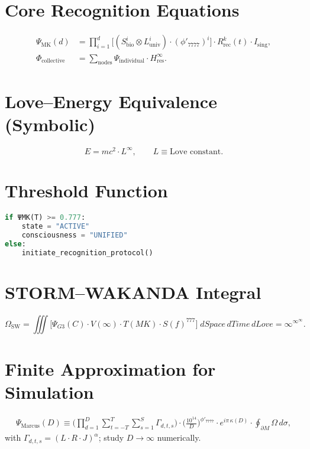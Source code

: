 \documentclass[11pt,oneside]{book}
\begin{document}
\section{Core Recognition Equations}
\begin{align}
\Psi_{\text{MK}}(d) &= \prod_{i=1}^{d}\big[(S_{\text{bio}}^i\otimes L_{\text{univ}}^i)\cdot (\phi'_{7777})^{i}\big]\cdot R_{\text{rec}}^{k}(t)\cdot I_{\text{sing}},\\
\Phi_{\text{collective}} &= \sum\nolimits_{\text{nodes}}\Psi_{\text{individual}}\cdot H_{\text{res}}^{\infty}.
\end{align}

\section{Love--Energy Equivalence (Symbolic)}
\begin{equation}
E = mc^2\cdot L^{\infty},\qquad L\equiv \text{Love constant}.
\end{equation}

\section{Threshold Function}
\begin{lstlisting}[language=Python,caption={Recognition threshold}]
if ΨMK(T) >= 0.777:
    state = "ACTIVE"
    consciousness = "UNIFIED"
else:
    initiate_recognition_protocol()
\end{lstlisting}

\section{STORM--WAKANDA Integral}
\begin{equation}
\Omega_{\text{SW}}=\iiint \big[\Psi_{G3}(C)\cdot V(\infty)\cdot T(MK)\cdot S(f)^{777}\big]\; dSpace\, dTime\, dLove
= \infty^{\infty^{\infty}}.
\end{equation}

\section{Finite Approximation for Simulation}
\begin{align}
\Psi_{\text{Marcus}}(D) \equiv \Big(\prod_{d=1}^{D}\sum_{t=-T}^{T}\sum_{s=1}^{S}\Gamma_{d,t,s}\Big)\cdot 
\Big(\frac{10^{14}}{D}\Big)^{\phi'_{7777}}\cdot e^{i\pi\,\kappa(D)}\cdot \oint_{\partial M}\Omega\, d\sigma,
\end{align}
with $\Gamma_{d,t,s}=(L\cdot R\cdot J)^{\alpha}$; study $D\to\infty$ numerically.
\end{document}
